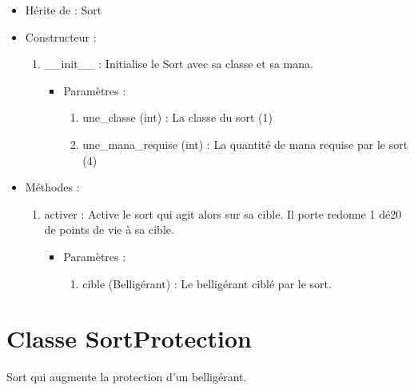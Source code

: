 \documentclass[12pt,pdftex,oneside]{article}
\begin{document}
  \begin{itemize}
  \item Hérite de : Sort


  \item Constructeur : 

  \begin{enumerate}
  \item \_\_init\_\_ : Initialise le Sort avec sa classe et sa mana.
    \begin{itemize}
    \item Paramètres : 
      \begin{enumerate}
      \item une\_classe (int) : La classe du sort (1)
      \item une\_mana\_requise (int) : La quantité de mana requise par le sort (4)
      \end{enumerate}
    \end{itemize}

  \end{enumerate}

  \item Méthodes : 

    \begin{enumerate}
    \item activer : Active le sort qui agit alors sur sa cible. Il porte redonne
      1 dé20 de points de vie à sa cible.
      \begin{itemize}
      \item Paramètres : 
        \begin{enumerate}
        \item cible (Belligérant) : Le belligérant ciblé par le sort.
        \end{enumerate}
      \end{itemize}
    \end{enumerate}

  \end{itemize}

  \section {Classe SortProtection}

  Sort qui augmente la protection d'un belligérant.
\end{document}
